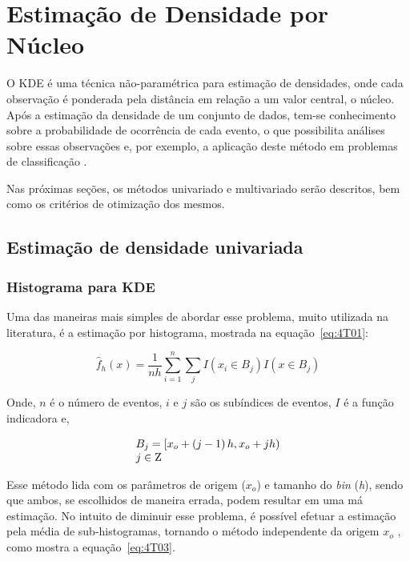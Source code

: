 \chapter{Estimação de Densidade por Núcleo}\label{cap:kde}

O \ac{KDE} é uma técnica não-paramétrica para estimação de densidades, onde cada observação é ponderada pela distância em relação a um valor central, o núcleo. Após a estimação da densidade de um conjunto de dados, tem-se conhecimento sobre a probabilidade de ocorrência de cada evento, o que possibilita análises sobre essas observações e, por exemplo, a aplicação deste método em problemas de classificação \cite{kernelthesis}.

Nas próximas seções, os métodos univariado e multivariado serão descritos, bem como os critérios de otimização dos mesmos.

\section{Estimação de densidade univariada}\label{sec:kdeuni}

\subsection{Histograma para KDE}

Uma das maneiras mais simples de abordar esse problema, muito utilizada na literatura, é a estimação por histograma, mostrada na equação~\ref{eq:4T01}:

\begin{equation}\label{eq:4T01}
{\hat f_h}\left( x \right) = \frac{1}{{nh}}\sum\limits_{i = 1}^n {\sum\limits_j {I\left( {{x_i} \in {B_j}} \right)I\left( {x \in {B_j}} \right)} }
\end{equation}

Onde, $n$ é o número de eventos, $i$ e $j$ são os subíndices de eventos, $I$ é a função indicadora e,

\begin{equation}\label{eq:4T02}
\begin{array}{l}
 {B_j} = \left[ {{x_o} + \left( {j - 1} \right)h,{x_o} + jh} \right) \\
 j \in {\rm{Z}} \\
 \end{array}
\end{equation}

Esse método lida com os parâmetros de origem (${x_o}$) e tamanho do \emph{bin} (\emph{h}), sendo que ambos, se escolhidos de maneira errada, podem resultar em uma má estimação. No intuito de diminuir esse problema, é possível efetuar a estimação pela média de sub-histogramas, tornando o método independente da origem ${x_o}$ \cite{seather1992performance}, como mostra a equação~\ref{eq:4T03}.

